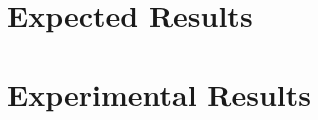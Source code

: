 \documentclass{article}
\begin{document}
\section*{Expected Results}

\setcounter{figure}{6}
\newcommand{\isExpected}{-expected}





\section*{Experimental Results}

\setcounter{figure}{6}
\renewcommand{\isExpected}{}




\end{document}
